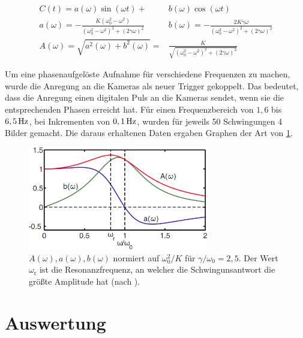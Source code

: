 \documentclass[numbers=noenddot,a4paper,notitlepage,twoside,BCOR15mm]{scrbook}
\newcommand{\ix}[1]{_\text{#1}}
\begin{document}
				\begin{align}
					C\left(t\right)=a\left(\omega\right)\sin\left(\omega t\right)+&b\left(\omega\right)\cos\left(\omega t\right) \label{eq:gedämpft} \\
					a\left(\omega\right)=-\frac{K\left(\omega\ix{0}^2-\omega^2\right)}{\left(\omega\ix{0}^2-\omega^2\right)^2+\left(2\gamma\omega\right)^2} \quad& b\left(\omega\right)=-\frac{2K\gamma\omega}{\left(\omega\ix{0}^2-\omega^2\right)^2+\left(2\gamma\omega\right)^2} \\
					A\left(\omega\right)=\sqrt{a^2\left(\omega\right)+b^2\left(\omega\right)}=&\frac{K}{\sqrt{\left(\omega\ix{0}^2-\omega^2\right)^2+\left(2\gamma\omega\right)^2}} \label{eq:amplitud}
				\end{align}

	\newpage

			Um eine phasenaufgelöste Aufnahme für verschiedene Frequenzen zu machen, wurde die Anregung an die Kameras als neuer Trigger gekoppelt. Das bedeutet, dass die Anregung einen digitalen Puls an die Kameras sendet, wenn sie die entsprechenden Phasen erreicht hat. Für einen Frequenzbereich von $1,6$ bis $\unit[6,5]{Hz}$, bei Inkrementen von $\unit[0,1]{Hz}$, wurden für jeweils 50 Schwingungen 4 Bilder gemacht. Die daraus erhaltenen Daten ergaben Graphen der Art von \ref{img:amplitud}.

				\begin{figure}[H]
					\centering
					\includegraphics[width=0.7\textwidth,height=0.35\textwidth]{figs/amplitud.png}
					\caption{$A\left(\omega\right), a\left(\omega\right), b\left(\omega\right)$ normiert auf $\omega\ix{0}^2/K $ für $\gamma/\omega\ix{0}=2,5$. Der Wert $\omega\ix{r}$ ist die Resonanzfrequenz, an welcher die Schwingunsantwort die größte Amplitude hat (nach \cite{Carstensen11}).}
					\label{img:amplitud}
				\end{figure}

	\chapter{Auswertung}\label{sec:auswert}
\end{document}
